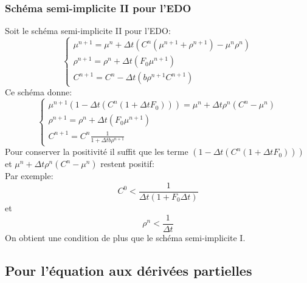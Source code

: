 \documentclass[11pt]{article}
\newcommand{\Dt}{\Delta t}
\begin{document}
\subsubsection{Schéma semi-implicite II pour l'EDO}
Soit le schéma semi-implicite II pour l'EDO:
\begin{equation} \boxed{\left\{
                \begin{array}{ll}
                   \mu^{n+1} = \mu^{n}+  \Dt( C^{n}(\mu^{n+1} + \rho^{n+1}) -\mu^{n}\rho^{n})\\
                \rho^{n+1}=  \rho^{n}+ \Dt (F_0 \mu^{n+1}) \\
                 C^{n+1} =C^{n}- \Dt(b\rho^{n+1}C^{n+1})
                \end{array}
              \right.}
\end{equation}
Ce schéma donne:
\begin{equation*} \left\{
                \begin{array}{ll}
                   \mu^{n+1}(1-\Dt(C^{n}(1+\Dt F_0))) = \mu^{n}+  \Dt \rho^{n}(C^{n}-\mu^{n}) \\
                \rho^{n+1}=  \rho^{n}+ \Dt (F_0 \mu^{n+1}) \\
                 C^{n+1} =C^{n}\frac{1}{1+ \Dt b\rho^{n+1}}
                \end{array}
              \right.
\end{equation*}
Pour conserver la positivité il suffit que les terme $(1-\Dt(C^{n}(1+\Dt F_0)))$ et $\mu^{n}+  \Dt \rho^{n}(C^{n}-\mu^{n})$ restent positif:\\
Par exemple: 
\begin{equation}
	\boxed{C^0< \frac{1}{\Dt(1+F_0\Dt)}}
\end{equation}
et 
\begin{equation}
	\boxed{\rho^n< \frac{1}{\Dt}}
\end{equation}
On obtient une condition de plus que le schéma semi-implicite I.
\subsection{Pour l'équation aux dérivées partielles}
\end{document}

